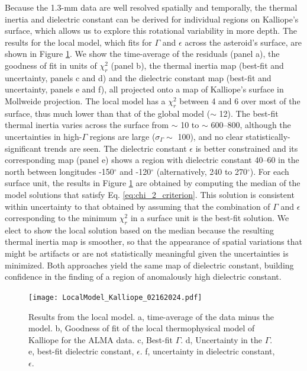 \documentclass[]{aastex631}
\begin{document}
Because the 1.3-mm data are well resolved spatially and temporally, the thermal inertia and dielectric constant can be derived for individual regions on Kalliope's surface, which allows us to explore this rotational variability in more depth. The results for the local model, which fits for $\Gamma$ and $\epsilon$ across the asteroid's surface, are shown in Figure \ref{fig:results_local}. We show the time-average of the residuals (panel a), the goodness of fit in units of $\chi_r^2$ (panel b), the thermal inertia map (best-fit and uncertainty, panels c and d) and the dielectric constant map (best-fit and uncertainty, panels e and f), all projected onto a map of Kalliope's surface in Mollweide projection. The local model has a $\chi_r^2$ between 4 and 6 over most of the surface, thus much lower than that of the global model ($\sim$ 12). The best-fit thermal inertia varies across the surface from $\sim$ 10 to $\sim$ 600–800, although the uncertainties in high-$\Gamma$ regions are large ($\sigma_{\Gamma} \sim$ 100), and no clear statistically-significant trends are seen. The dielectric constant $\epsilon$ is better constrained and its corresponding map (panel e) shows a region with dielectric constant 40–60 in the north between longitudes -150$^{\circ}$ and -120$^{\circ}$ (alternatively, 240 to 270$^{\circ}$). For each surface unit, the results in Figure \ref{fig:results_local} are obtained by computing the median of the model solutions that satisfy Eq. \ref{eq:chi_2_criterion}. This solution is consistent within uncertainty to that obtained by assuming that the combination of $\Gamma$ and $\epsilon$ corresponding to the minimum $\chi^2_r$ in a surface unit is the best-fit solution. We elect to show the local solution based on the median because the resulting thermal inertia map is smoother, so that the appearance of spatial variations that might be artifacts or are not statistically meaningful given the uncertainties is minimized. Both approaches yield the same map of dielectric constant, building confidence in the finding of a region of anomalously high dielectric constant.

\begin{figure}[ht!]
\centering
\texttt{[image: LocalModel\_Kalliope\_02162024.pdf]}
\caption{Results from the local model. a, time-average of the data minus the model. b, Goodness of fit of the local thermophysical model of Kalliope for the ALMA data. c, Best-fit $\Gamma$. d, Uncertainty in the $\Gamma$. e, best-fit dielectric constant, $\epsilon$. f, uncertainty in dielectric constant, $\epsilon$.}\label{fig:results_local}
\end{figure}
\end{document}
